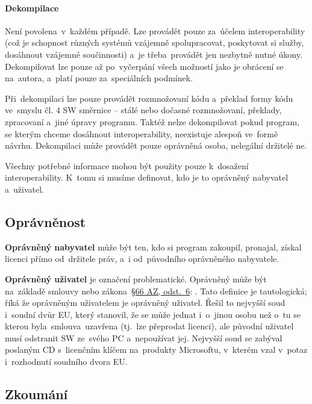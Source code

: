 \paragraph{Dekompilace} Není povolena~v~každém případě. Lze provádět pouze za~účelem interoperability (což je schopnost různých systémů vzájemně spolupracovat, poskytovat si služby, dosáhnout vzájemné součinnosti) a~je třeba~provádět jen nezbytně nutné úkony. Dekompilovat lze pouze až po~vyčerpání všech možností jako je obrácení se na~autora, a~platí pouze za~speciálních podmínek.

Při~dekompilaci lze pouze provádět rozmnožovaní kódu a~překlad formy kódu ve~smyslu čl. 4 SW směrnice -- stálé nebo dočasné rozmnožovaní, překlady, zpracovaní a~jiné úpravy programu. Taktéž nelze dekompilovat pokud program, se kterým chceme dosáhnout interoperability, neexistuje alespoň ve~formě návrhu. Dekompilaci může provádět pouze oprávněná osoba, nelegální držitelé ne.

Všechny potřebné informace mohou být použity pouze k~dosažení interoperability. K~tomu si musíme definovat, kdo je to oprávněný nabyvatel a~uživatel.

\subsection{Oprávněnost}

\textbf{Oprávněný nabyvatel} může být ten, kdo si program zakoupil, pronajal, získal licenci přímo od~držitele práv, a~i od~původního oprávněného nabyvatele.

\textbf{Oprávněný uživatel} je označení problematické. Oprávněný může být na~základě smlouvy nebo zákona~\href{https://www.zakonyprolidi.cz/cs/2000-121#p66-6}{§66 AZ, odst.~6}: \emph{}. Tato definice je tautologická; říká že oprávněným uživatelem je oprávněný uživatel. Řešil to nejvyšší soud i~soudní dvůr EU, který stanovil, že se může jednat i~o~jinou osobu než o~tu se kterou byla~smlouva~uzavřena (tj.~lze přeprodat licenci), ale původní uživatel musí odstranit SW ze~svého PC a~nepoužívat jej. Nejvyšší soud se zabýval poslaným CD s~licenčním klíčem na~produkty Microsoftu, v~kterém vzal v~potaz i~rozhodnutí soudního dvora EU.

\subsection{Zkoumání}

